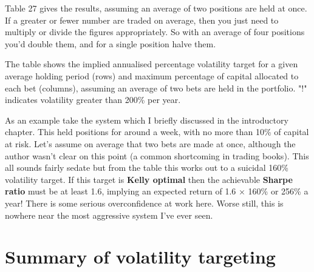 Table 27 gives the results, assuming an average of two positions are held at once. If a greater or fewer number are traded on average, then you just need to multiply or divide the figures appropriately. So with an average of four positions you'd double them, and for a single position halve them.

 \begingroup \small \centering
{}
\par \endgroup

The table shows the implied annualised percentage volatility target for a given average holding period (rows) and maximum percentage of capital allocated to each bet (columns), assuming an average of two bets are held in the portfolio. "!" indicates volatility greater than 200\% per year.

As an example take the system which I briefly discussed in the introductory chapter. This held positions for around a week, with no more than 10\% of capital at risk. Let's assume on average that two bets are made at once, although the author wasn't clear on this point (a common shortcoming in trading books).
This all sounds fairly sedate but from the table this works out to a suicidal 160\% volatility target. If this target is \textbf{Kelly optimal} then the achievable \textbf{Sharpe ratio} must be at least 1.6, implying an expected return of 1.6 × 160\% or 256\% a year! There is some serious overconfidence at work here. Worse still, this is nowhere near the most aggressive system I've ever seen.

\section*{Summary of volatility targeting}  {}

